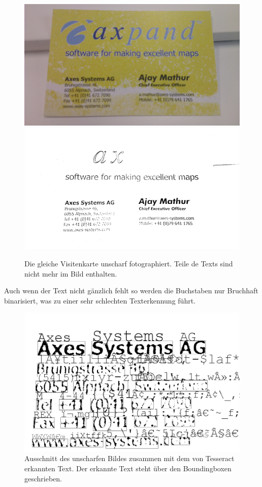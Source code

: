\documentclass[10pt]{article}
\begin{document}
\begin{figure}[h!]
	\centering
	\includegraphics[scale= 0.06]{BlurredAMathur.jpg}
	\includegraphics[scale= 0.06]{BlurredAMathurPhansalkar.png}
	\caption{ Die gleiche Visitenkarte unscharf fotographiert. Teile de Texts sind nicht mehr im Bild enthalten.}
\end{figure}
Auch wenn der Text nicht gänzlich fehlt so werden die Buchstaben nur Bruchhaft binarisiert, was zu einer sehr schlechten Texterkennung führt.
\begin{figure}[h!]
	\centering
	\includegraphics[scale= 0.3]{BlurredAMathurPhansalkarZoom.png}
	\caption{Ausschnitt des unscharfen Bildes zusammen mit dem von Tesseract erkannten Text.
	Der erkannte Text steht über den Boundingboxen geschrieben.}
\end{figure}
\end{document}

